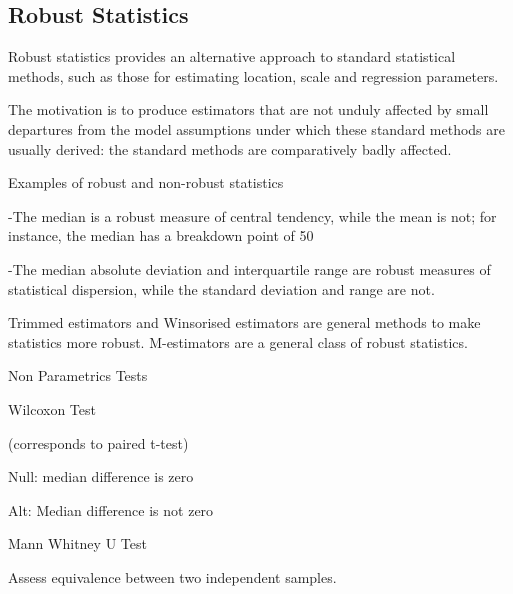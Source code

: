
\subsection*{Robust Statistics}

Robust statistics provides an alternative approach to standard statistical methods, such as those for estimating location, scale and regression parameters. 


The motivation is to produce estimators that are not unduly affected by small departures from the model assumptions under which these standard methods are usually derived: the standard methods are comparatively badly affected.


Examples of robust and non-robust statistics

 -The median is a robust measure of central tendency, while the mean is not; for instance, the median has a breakdown point of 50%

 -The median absolute deviation and interquartile range are robust measures of statistical dispersion, while the standard deviation and range are not.


Trimmed estimators and Winsorised estimators are general methods to make statistics more robust. M-estimators are a general class of robust statistics.

Non Parametrics Tests


Wilcoxon Test 


(corresponds to paired t-test) 


Null: median difference is zero

Alt: Median difference is not zero


Mann Whitney U Test

Assess equivalence between two independent samples.

